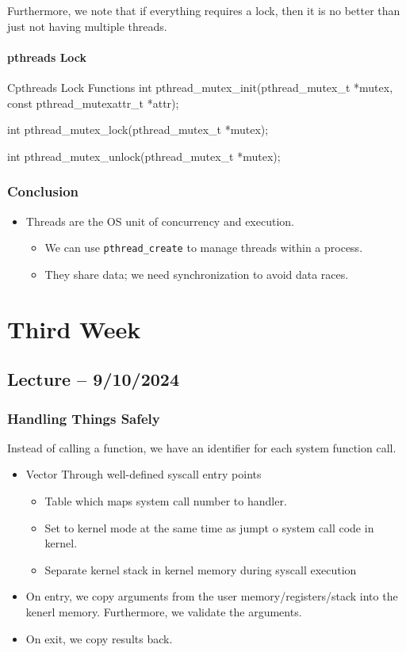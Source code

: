 \documentclass[openany]{book}
\begin{document}
Furthermore, we note that if everything requires a lock, then it is no better than just not having multiple threads.

\subsubsection{pthreads Lock}
\begin{code}{C}{pthreads Lock Functions}
int pthread_mutex_init(pthread_mutex_t *mutex, const pthread_mutexattr_t *attr);

int pthread_mutex_lock(pthread_mutex_t *mutex);

int pthread_mutex_unlock(pthread_mutex_t *mutex);
\end{code}

\subsection{Conclusion}
\begin{itemize}
	\item Threads are the OS unit of concurrency and execution.
	\begin{itemize}
		\item We can use \texttt{pthread\_create} to manage threads within a process.
		\item They share data; we need synchronization to avoid data races.
	\end{itemize}
\end{itemize}

\chapter{Third Week}
\section{Lecture -- 9/10/2024}
\subsection{Handling Things Safely}
Instead of calling a function, we have an identifier for each system function call.


\begin{itemize}
	\item Vector Through well-defined syscall entry points
	\begin{itemize}
		\item Table which maps system call number to handler.
		\item Set to kernel mode at the same time as jumpt o system call code in kernel.
		\item Separate kernel stack in kernel memory during syscall execution
	\end{itemize}

	\item On entry, we copy arguments from the user memory/registers/stack into the kenerl memory. Furthermore, we validate the arguments.
	
	\item On exit, we copy results back.
\end{itemize}
\end{document}
